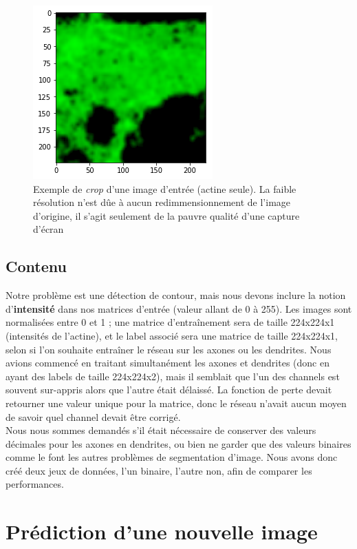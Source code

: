 \documentclass{report}
\begin{document}
\begin{figure}[H]
\centering
\includegraphics[scale=0.35]{"ex_crop"}
\caption{Exemple de \textit{crop} d'une image d'entrée (actine seule). La faible
résolution n'est dûe à aucun redimmensionnement de l'image d'origine, il s'agit
seulement de la pauvre qualité d'une capture d'écran}
\end{figure}

\subsection{Contenu}

Notre problème est une détection de contour, mais nous devons inclure la notion
d'\textbf{intensité} dans nos matrices d'entrée (valeur allant de 0 à 255).
Les images sont normalisées entre 0 et 1 ; une matrice d'entraînement sera de
taille 224x224x1 (intensités de l'actine), et le label associé sera une matrice
de taille 224x224x1, selon si l'on souhaite entraîner le réseau sur les axones
ou les dendrites. Nous avions commencé en traitant simultanément les axones et
dendrites (donc en ayant des labels de taille 224x224x2), mais il semblait
que l'un des channels est souvent sur-appris alors que l'autre était délaissé.
La fonction de perte devait retourner une valeur unique pour la matrice, donc
le réseau n'avait aucun moyen de savoir quel channel devait être corrigé. \\
Nous nous sommes demandés s'il était nécessaire de conserver des valeurs décimales
pour les axones en dendrites, ou bien ne garder que des valeurs binaires comme le
font les autres problèmes de segmentation d'image. Nous avons donc créé deux jeux
de données, l'un binaire, l'autre non, afin de comparer les performances.

\section{Prédiction d'une nouvelle image}
\end{document}
